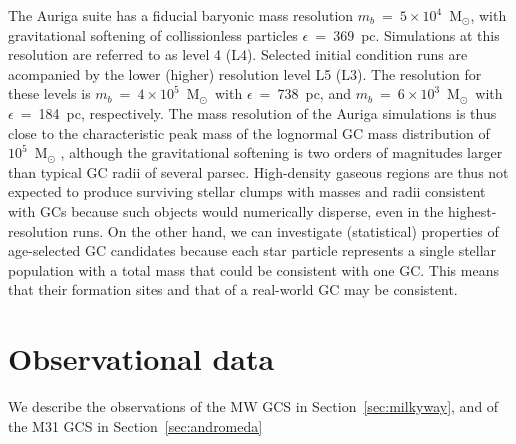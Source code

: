\documentclass[a4paper,fleqn,usenatbib]{mnras}
\newcommand{\Sun}[0]{\ensuremath{_{\odot}}}
\begin{document}
The Auriga suite has a fiducial baryonic mass resolution $m_b$~=~$5 \times 10^4$~M\Sun,
with gravitational softening of collissionless particles $\epsilon$~=~369~pc.
Simulations at this resolution are referred to as level 4 (L4). Selected
initial condition runs are acompanied by the lower (higher) resolution level L5 (L3).
The resolution for these levels is $m_b$~=~$4 \times 10^5$~M\Sun \, with 
$\epsilon$~=~738~pc, and $m_b$~=~$6 \times 10^3$~M\Sun \, with $\epsilon$~=~184~pc,
respectively. The mass resolution of the Auriga simulations is thus close to the 
characteristic peak mass of the lognormal GC mass distribution of $10^{5}$~M\Sun 
\citep{1991ARA&A..29..543H}, although the gravitational softening is two orders 
of magnitudes larger than typical GC radii of several parsec. High-density gaseous 
regions are thus not expected to produce surviving stellar clumps with masses and 
radii consistent with GCs because such objects would numerically disperse, even 
in the highest-resolution runs. On the other hand, we can investigate (statistical) 
properties of age-selected GC candidates because each star particle represents a
single stellar population with a total mass that could be consistent with one GC. 
This means that their formation sites and that of a real-world GC may be consistent.

\section{Observational data}
\label{sec:observations}
We describe the observations of the MW GCS in Section~\ref{sec:milkyway},
and of the M31 GCS in Section~\ref{sec:andromeda}
\end{document}
